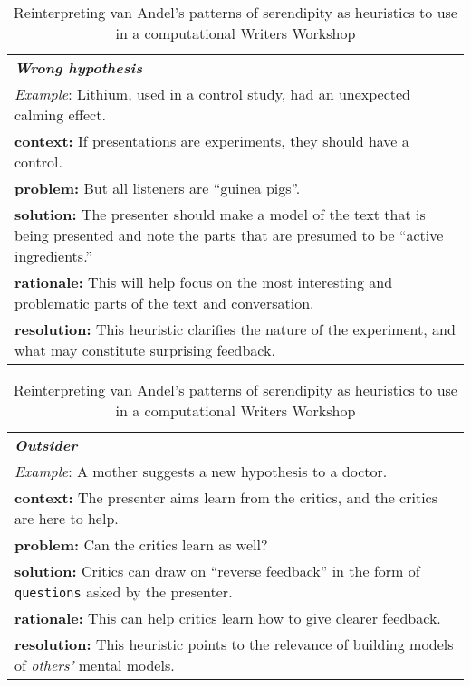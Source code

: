 \begin{table}[p]
\begin{tabular}{p{}}
{\bf\emph{Wrong hypothesis}}  \\[.1cm]
\emph{Example}:  Lithium, used in a control study, had an unexpected calming effect. \\[.1cm]
{\bf context:} If presentations are experiments, they should have a control. \\
{\bf problem:} But all listeners are ``guinea pigs''.\\
{\bf solution:} The presenter should make a model of the text that is being presented and note the parts that are presumed to be ``active ingredients.'' \\
{\bf rationale:} This will help focus on the most interesting and problematic parts of the text and conversation.\\
{\bf resolution:} This heuristic clarifies the nature of the experiment, and what may constitute surprising feedback. \\
\end{tabular}
\medskip

\begin{tabular}{p{}}
{\bf\emph{Outsider}}  \\[.1cm]
\emph{Example}:  A mother suggests a new hypothesis to a doctor. \\[.1cm]
{\bf context:} The presenter aims learn from the critics, and the critics are here to help. \\
{\bf problem:} Can the critics learn as well?\\
{\bf solution:} Critics can draw on ``reverse feedback'' in the form of {\tt questions} asked by the presenter.\\
{\bf rationale:} This can help critics learn how to give clearer feedback.\\
{\bf resolution:} This heuristic points to the relevance of building models of \emph{others'} mental models.\\
\end{tabular}
\vspace{.1cm}
\caption{Reinterpreting van Andel's patterns of serendipity as heuristics to use in a computational Writers Workshop\label{tab:reinterpret}}
\end{table}



\bigskip




